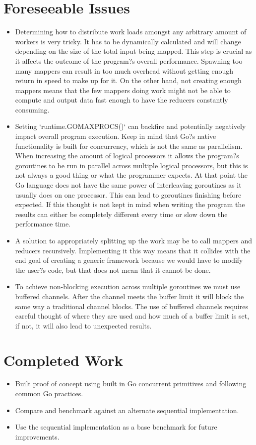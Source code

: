 \documentclass[report]{IEEEtran}
\begin{document}
\appendix
\section*{Foreseeable Issues}
	\begin{itemize}
		\item Determining how to distribute work loads amongst any arbitrary amount of workers is very tricky. It has to be dynamically calculated and will change depending on the size of the total input being mapped. This step is crucial as it affects the outcome of the program?s overall performance. Spawning too many mappers can result in too much overhead without getting enough return in speed to make up for it. On the other hand, not creating enough mappers means that the few mappers doing work might not be able to compute and output data fast enough to have the reducers constantly consuming.
		\item Setting `runtime.GOMAXPROCS()` can backfire and potentially negatively impact overall program execution. Keep in mind that Go?s native functionality is built for concurrency, which is not the same as parallelism. When increasing the amount of logical processors it allows the program?s goroutines to be run in parallel across multiple logical processors, but this is not always a good thing or what the programmer expects. At that point the Go language does not have the same power of interleaving goroutines as it usually does on one processor. This can lead to goroutines  finishing before expected. If this thought is not kept in mind when writing the program the results can either be completely different every time or slow down the performance time.
		\item A solution to appropriately splitting up the work may be to call mappers and reducers recursively. Implementing it this way means that it collides with the end goal of creating a generic framework because we would have to modify the user?s code, but that does not mean that it cannot be done.
		\item To achieve non-blocking execution across multiple goroutines we must use buffered channels. After the channel meets the buffer limit it will block the same way a traditional channel blocks. The use of buffered channels requires careful thought of where they are used and how much of a buffer limit is set, if not, it will also lead to unexpected results.
	\end{itemize}
\section*{Completed Work}
	\begin{itemize}
		\item Built proof of concept using built in Go concurrent primitives and following common Go practices.
		\item Compare and benchmark against an alternate sequential implementation.
		\item Use the sequential implementation as a base benchmark for future improvements.
	\end{itemize}
\end{document}
